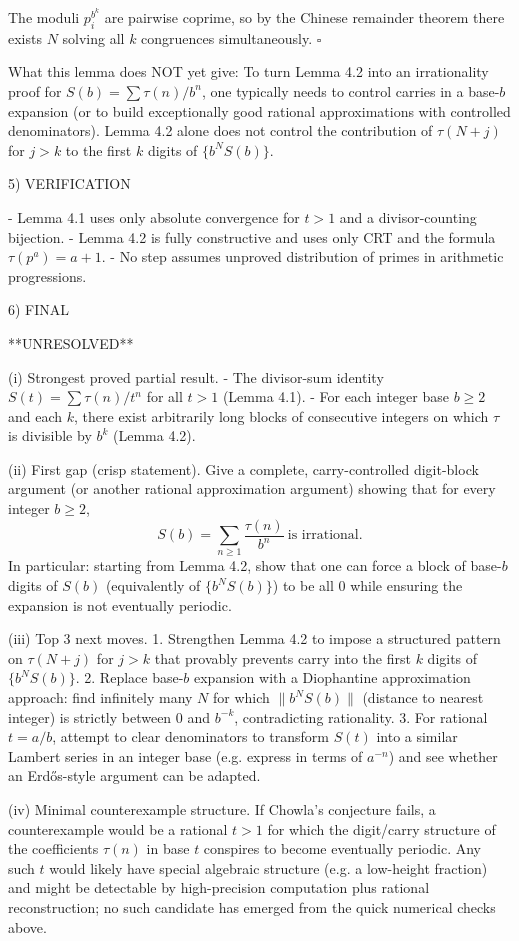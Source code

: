 The moduli $p_i^{b^k}$ are pairwise coprime, so by the Chinese remainder theorem there exists $N$
solving all $k$ congruences simultaneously.
$\square$

What this lemma does NOT yet give:
To turn Lemma 4.2 into an irrationality proof for $S(b)=\sum \tau(n)/b^n$, one typically needs to
control carries in a base-$b$ expansion (or to build exceptionally good rational approximations with
controlled denominators). Lemma 4.2 alone does not control the contribution of $\tau(N+j)$ for
$j>k$ to the first $k$ digits of $\{b^N S(b)\}$.

5) VERIFICATION

- Lemma 4.1 uses only absolute convergence for $t>1$ and a divisor-counting bijection.
- Lemma 4.2 is fully constructive and uses only CRT and the formula $\tau(p^a)=a+1$.
- No step assumes unproved distribution of primes in arithmetic progressions.

6) FINAL

**UNRESOLVED**

(i) Strongest proved partial result.
- The divisor-sum identity $S(t)=\sum \tau(n)/t^n$ for all $t>1$ (Lemma 4.1).
- For each integer base $b\ge 2$ and each $k$, there exist arbitrarily long blocks of consecutive integers
  on which $\tau$ is divisible by $b^k$ (Lemma 4.2).

(ii) First gap (crisp statement).
Give a complete, carry-controlled digit-block argument (or another rational approximation argument)
showing that for every integer $b\ge 2$,
\[
  S(b)=\sum_{n\ge 1}\frac{\tau(n)}{b^n}\ \text{is irrational}.
\]
In particular: starting from Lemma 4.2, show that one can force a block of base-$b$ digits of $S(b)$
(equivalently of $\{b^N S(b)\}$) to be all $0$ while ensuring the expansion is not eventually periodic.

(iii) Top 3 next moves.
1. Strengthen Lemma 4.2 to impose a structured pattern on $\tau(N+j)$ for $j>k$ that provably prevents
   carry into the first $k$ digits of $\{b^N S(b)\}$.
2. Replace base-$b$ expansion with a Diophantine approximation approach: find infinitely many $N$ for which
   $\|b^N S(b)\|$ (distance to nearest integer) is strictly between $0$ and $b^{-k}$, contradicting rationality.
3. For rational $t=a/b$, attempt to clear denominators to transform $S(t)$ into a similar Lambert series
   in an integer base (e.g. express in terms of $a^{-n}$) and see whether an Erd\H{o}s-style argument can
   be adapted.

(iv) Minimal counterexample structure.
If Chowla's conjecture fails, a counterexample would be a rational $t>1$ for which the digit/carry
structure of the coefficients $\tau(n)$ in base $t$ conspires to become eventually periodic.
Any such $t$ would likely have special algebraic structure (e.g. a low-height fraction) and might be
detectable by high-precision computation plus rational reconstruction; no such candidate has emerged
from the quick numerical checks above.




